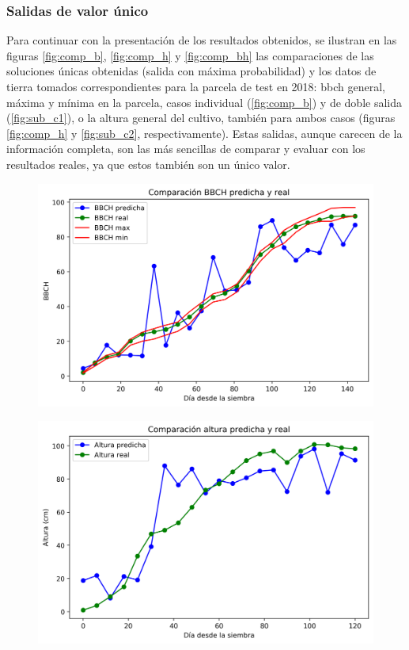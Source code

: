 \subsubsection{Salidas de valor único}
\par Para continuar con la presentación de los resultados obtenidos, se ilustran en las figuras \ref{fig:comp_b}, \ref{fig:comp_h} y \ref{fig:comp_bh} las comparaciones de las soluciones únicas obtenidas (salida con máxima probabilidad) y los datos de tierra tomados correspondientes para la parcela de test en 2018: \gls{bbch} general, máxima y mínima en la parcela, casos individual (\ref{fig:comp_b}) y de doble salida (\ref{fig:sub_c1}), o la altura general del cultivo, también para ambos casos (figuras \ref{fig:comp_h} y \ref{fig:sub_c2}, respectivamente). Estas salidas, aunque carecen de la información completa, son las más sencillas de comparar y evaluar con los resultados reales, ya que estos también son un único valor.  
\\

\begin{figure}[h]
\centering
\includegraphics[width=0.95\linewidth]{archivos/tfg/Mean/TEST_PARC_FINAL}
\end{figure}
\begin{figure}[h]
\centering
\includegraphics[width=0.95\linewidth]{archivos/tfg/Mean/TEST_PARC_FINAL_H}
\end{figure}

